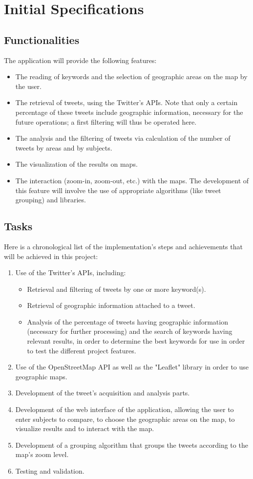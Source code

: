 \documentclass[a4paper,11pt]{report}
\begin{document}
\chapter{Initial Specifications}
\section{Functionalities}
The application will provide the following features:
\begin{itemize}
	\item The reading of keywords and the selection of geographic areas on the map by the user.
	\item The retrieval of tweets, using the Twitter's APIs.
		Note that only a certain percentage of these tweets include geographic information, necessary for the future operations; a first filtering will thus be operated here.
	\item The analysis and the filtering of tweets via calculation of the number of tweets by areas and by subjects.
	\item The visualization of the results on maps.
	\item The interaction (zoom-in, zoom-out, etc.) with the maps. The development of this feature will involve the use of appropriate algorithms (like tweet grouping) and libraries.
\end{itemize}

\section{Tasks}
 Here is a chronological list of the implementation's steps and achievements that will be achieved in this project:
\begin{enumerate}
	\item Use of the Twitter's APIs, including:
	\begin{itemize}
		\item Retrieval and filtering of tweets by one or more keyword(s).
		\item Retrieval of geographic information attached to a tweet.
		\item Analysis of the percentage of tweets having geographic information (necessary for further processing) and the search of keywords having relevant results, in order to determine the best keywords for use in order to test the different project features.
	\end{itemize}
	\item Use of the OpenStreetMap API as well as the "Leaflet" library in order to use geographic maps.
	\item Development of the tweet's acquisition and analysis parts.
	\item Development of the web interface of the application, allowing the user to enter subjects to compare, to choose the geographic areas on the map, to visualize results and to interact with the map.
	\item Development of a grouping algorithm that groups the tweets according to the map's zoom level.
	\item Testing and validation.
\end{enumerate}
\end{document}
